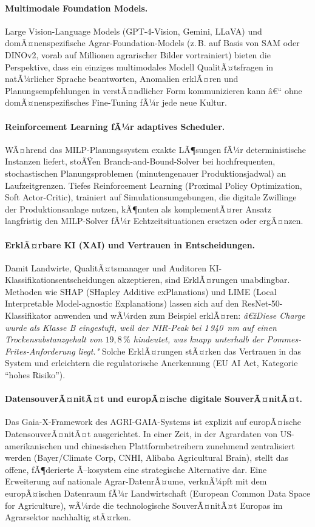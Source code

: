 ﻿\documentclass[12pt,a4paper]{article}
\theoremstyle{plain}
\theoremstyle{definition}
\begin{document}
	\paragraph{Multimodale Foundation Models.}
	Large Vision-Language Models (GPT-4-Vision, Gemini, LLaVA) und
	domÃ¤nenspezifische Agrar-Foundation-Models (z.\,B. auf Basis von
	SAM oder DINOv2, vorab auf Millionen agrarischer Bilder vortrainiert)
	bieten die Perspektive, dass ein einziges multimodales Modell
	QualitÃ¤tsfragen in natÃ¼rlicher Sprache beantworten, Anomalien
	erklÃ¤ren und Planungsempfehlungen in verstÃ¤ndlicher Form kommunizieren
	kann â€“ ohne domÃ¤nenspezifisches Fine-Tuning fÃ¼r jede neue Kultur.

	\paragraph{Reinforcement Learning fÃ¼r adaptives Scheduler.}
	WÃ¤hrend das MILP-Planungs\-system exakte LÃ¶sungen fÃ¼r deterministische
	Instanzen liefert, stoÃŸen Branch-and-Bound-Solver bei hochfrequenten,
	stochastischen Planungsproblemen (minutengenauer Produktionsjadwal)
	an Laufzeitgrenzen. Tiefes Reinforcement Learning (Proximal Policy
	Optimization, Soft Actor-Critic), trainiert auf Simulationsumgebungen,
	die digitale Zwillinge der Produktionsanlage nutzen, kÃ¶nnten als
	komplementÃ¤rer Ansatz langfristig den MILP-Solver fÃ¼r Echtzeitsituationen
	ersetzen oder ergÃ¤nzen.

	\paragraph{ErklÃ¤rbare KI (XAI) und Vertrauen in Entscheidungen.}
	Damit Landwirte, QualitÃ¤tsmanager und Auditoren KI-Klassifikationsentscheidungen
	akzeptieren, sind ErklÃ¤rungen unabdingbar. Methoden wie SHAP
	(SHapley Additive exPlanations) und LIME (Local Interpretable
	Model-agnostic Explanations) lassen sich auf den ResNet-50-Klassifikator
	anwenden und wÃ¼rden zum Beispiel erklÃ¤ren: \textit{â€žDiese Charge
	wurde als Klasse B eingestuft, weil der NIR-Peak bei 1\,940~nm
	auf einen Trockensubstanzgehalt von $19{,}8\,\%$ hindeutet, was
	knapp unterhalb der Pommes-Frites-Anforderung liegt."} Solche
	ErklÃ¤rungen stÃ¤rken das Vertrauen in das System und erleichtern
	die regulatorische Anerkennung (EU AI Act, Kategorie ``hohes Risiko'').

	\paragraph{DatensouverÃ¤nitÃ¤t und europÃ¤ische digitale SouverÃ¤nitÃ¤t.}
	Das Gaia-X-Framework des AGRI-GAIA-Systems ist explizit auf
	europÃ¤ische DatensouverÃ¤nitÃ¤t ausgerichtet. In einer Zeit, in der
	Agrardaten von US-amerikanischen und chinesischen Plattformbetreibern
	zunehmend zentralisiert werden (Bayer/Climate Corp, CNHI,
	Alibaba Agricultural Brain), stellt das offene, fÃ¶derierte
	Ã–kosystem eine strategische Alternative dar. Eine Erweiterung
	auf nationale Agrar-DatenrÃ¤ume, verknÃ¼pft mit dem europÃ¤ischen
	Datenraum fÃ¼r Landwirtschaft (European Common Data Space
	for Agriculture), wÃ¼rde die technologische SouverÃ¤nitÃ¤t Europas
	im Agrarsektor nachhaltig stÃ¤rken.
\end{document}
